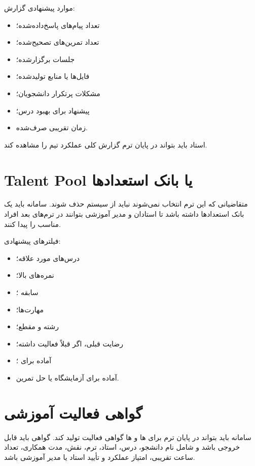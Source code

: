 \documentclass[12pt,a4paper]{article}
\begin{document}
موارد پیشنهادی گزارش:
\begin{itemize}
\item تعداد پیام‌های پاسخ‌داده‌شده؛
\item تعداد تمرین‌های تصحیح‌شده؛
\item جلسات برگزارشده؛
\item فایل‌ها یا منابع تولیدشده؛
\item مشکلات پرتکرار دانشجویان؛
\item پیشنهاد برای بهبود درس؛
\item زمان تقریبی صرف‌شده.
\end{itemize}

استاد باید بتواند در پایان ترم گزارش کلی عملکرد تیم  را مشاهده کند.

\section{Talent Pool یا بانک استعدادها}
متقاضیانی که این ترم انتخاب نمی‌شوند نباید از سیستم حذف شوند. سامانه باید یک بانک استعدادها داشته باشد تا استادان و مدیر آموزشی بتوانند در ترم‌های بعد افراد مناسب را پیدا کنند.

فیلترهای پیشنهادی:
\begin{itemize}
\item درس‌های مورد علاقه؛
\item نمره‌های بالا؛
\item سابقه ؛
\item مهارت‌ها؛
\item رشته و مقطع؛
\item رضایت قبلی، اگر قبلاً فعالیت داشته؛
\item آماده برای ؛
\item آماده برای آزمایشگاه یا حل تمرین.
\end{itemize}

\section{گواهی فعالیت آموزشی}
سامانه باید بتواند در پایان ترم برای ها و ها گواهی فعالیت تولید کند. گواهی باید قابل خروجی  باشد و شامل نام دانشجو، درس، استاد، ترم، نقش، مدت همکاری، تعداد ساعت تقریبی، امتیاز عملکرد و تأیید استاد یا مدیر آموزشی باشد.
\end{document}
